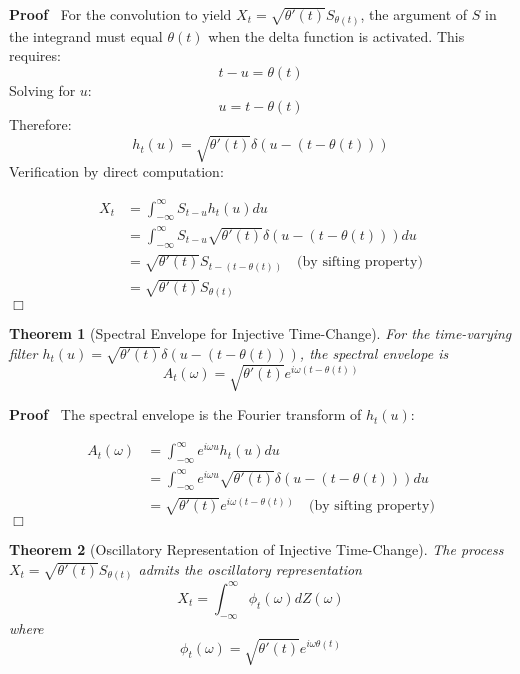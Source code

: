 \documentclass{article}
\newenvironment{proof}{\noindent\textbf{Proof\ }}{\hspace*{\fill}$\Box$\medskip}
\newtheorem{theorem}{Theorem}
\begin{document}
\begin{proof}
  For the convolution to yield $X_t = \sqrt{\theta' (t)} S_{\theta (t)}$, the
  argument of $S$ in the integrand must equal $\theta (t)$ when the delta
  function is activated. This requires:
  \[ t - u = \theta (t) \]
  Solving for $u$:
  \begin{equation}
    u = t - \theta (t)
  \end{equation}
  Therefore:
  \begin{equation}
    h_t (u) = \sqrt{\theta' (t)} \delta (u - (t - \theta (t)))
  \end{equation}
  Verification by direct computation:
  
  \begin{align}
    X_t & = \int_{- \infty}^{\infty} S_{t - u} h_t (u) du \\
    & = \int_{- \infty}^{\infty} S_{t - u}  \sqrt{\theta' (t)} \delta (u - (t
    - \theta (t))) du \\
    & = \sqrt{\theta' (t)} S_{t - (t - \theta (t))} \quad \text{(by sifting
    property)} \\
    & = \sqrt{\theta' (t)} S_{\theta (t)} 
  \end{align}
\end{proof}

\begin{theorem}
  [Spectral Envelope for Injective Time-Change] For the time-varying filter
  $h_t (u) = \sqrt{\theta' (t)} \delta (u - (t - \theta (t)))$, the spectral
  envelope is
  \[ A_t (\omega) = \sqrt{\theta' (t)} e^{i \omega (t - \theta (t))} \]
\end{theorem}

\begin{proof}
  The spectral envelope is the Fourier transform of $h_t (u)$:
  
  \begin{align}
    A_t (\omega) & = \int_{- \infty}^{\infty} e^{i \omega u} h_t (u) du \\
    & = \int_{- \infty}^{\infty} e^{i \omega u}  \sqrt{\theta' (t)} \delta (u
    - (t - \theta (t))) du \\
    & = \sqrt{\theta' (t)} e^{i \omega (t - \theta (t))} \quad \text{(by
    sifting property)} 
  \end{align}
\end{proof}

\begin{theorem}
  [Oscillatory Representation of Injective Time-Change] The process $X_t =
  \sqrt{\theta' (t)} S_{\theta (t)}$ admits the oscillatory representation
  \[ X_t = \int_{- \infty}^{\infty} \phi_t (\omega) dZ (\omega) \]
  where
  \[ \phi_t (\omega) = \sqrt{\theta' (t)} e^{i \omega \theta (t)} \]
\end{theorem}
\end{document}
